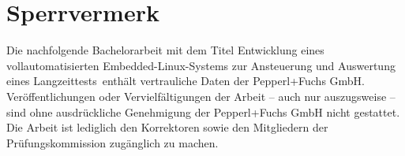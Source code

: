 \chapter*{Sperrvermerk}
\label{chapter_sperrvermerk}
\thispagestyle{empty}

Die nachfolgende Bachelorarbeit mit dem Titel \glqq Entwicklung eines vollautomatisierten Embedded-Linux-Systems zur Ansteuerung und Auswertung eines Langzeittests\grqq\ enthält
vertrauliche Daten der Pepperl+Fuchs GmbH. Veröffentlichungen oder Vervielfältigungen der
Arbeit – auch nur auszugsweise – sind ohne ausdrückliche Genehmigung der Pepperl+Fuchs GmbH
nicht gestattet. Die Arbeit ist lediglich den Korrektoren sowie den Mitgliedern
der Prüfungskommission zugänglich zu machen.


